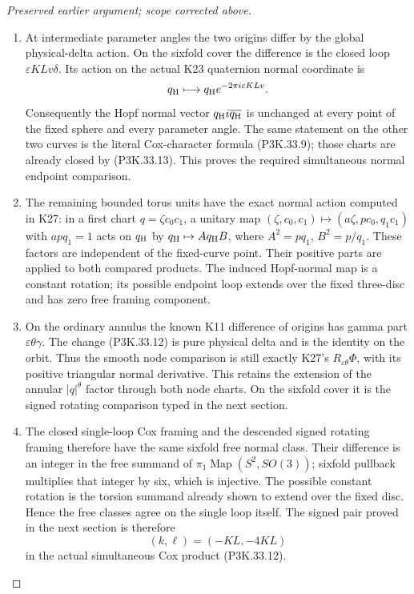 \begin{proof}[Preserved earlier argument; scope corrected above]
\begin{enumerate}[label=\arabic*.]
\item At intermediate parameter angles the two origins differ by the
global physical-delta action. On the sixfold cover the difference
is the closed loop \(\varepsilon KLv\delta\). Its action on the actual K23
quaternion normal coordinate is
\[
             q_{\rm H}\longmapsto
                       q_{\rm H}e^{-2\pi i\varepsilon KLv}.
\]
Consequently the Hopf normal vector
\(q_{\rm H}i\overline{q_{\rm H}}\) is unchanged at every
point of the fixed sphere and every parameter angle. The same
statement on the other two curves is the literal Cox-character
formula (P3K.33.9); those charts are already closed by (P3K.33.13).
This proves the required simultaneous normal endpoint comparison.

\item The remaining bounded torus units have the exact normal action
computed in K27: in a first chart \(q=\zeta c_0c_1\), a unitary
map \((\zeta,c_0,c_1)\mapsto(a\zeta,pc_0,q_1c_1)\) with
\(apq_1=1\) acts on \(q_{\rm H}\) by
\(q_{\rm H}\mapsto A q_{\rm H}B\), where
\(A^2=pq_1\), \(B^2=p/q_1\). These factors are independent
of the fixed-curve point. Their positive parts are applied to
both compared products. The induced Hopf-normal map is a
constant rotation; its possible endpoint loop extends over the
fixed three-disc and has zero free framing component.

\item On the ordinary annulus the known K11 difference of origins
has gamma part \(\varepsilon\theta\gamma\). The change (P3K.33.12) is pure
physical delta and is the identity on the orbit. Thus the
smooth node comparison is still exactly K27's
\(R_{\varepsilon\theta}\Phi\), with its positive triangular normal
derivative. This retains the extension of the annular
\(|q|^\theta\) factor through both node charts. On the
sixfold cover it is the signed rotating comparison typed in the
next section.

\item The closed single-loop Cox framing and the descended signed rotating
framing therefore have the same sixfold free normal class.
Their difference is an integer in the free summand of
\(\pi_1\operatorname{Map}(S^2,SO(3))\); sixfold pullback
multiplies that integer by six, which is injective. The possible
constant rotation is the torsion summand already shown to extend
over the fixed disc. Hence the free classes agree on the single
loop itself. The signed pair proved in the next section is therefore
\[
                       (k,\ell)=(-KL,-4KL)
\]
in the actual simultaneous Cox product (P3K.33.12).


\end{enumerate}
\end{proof}
